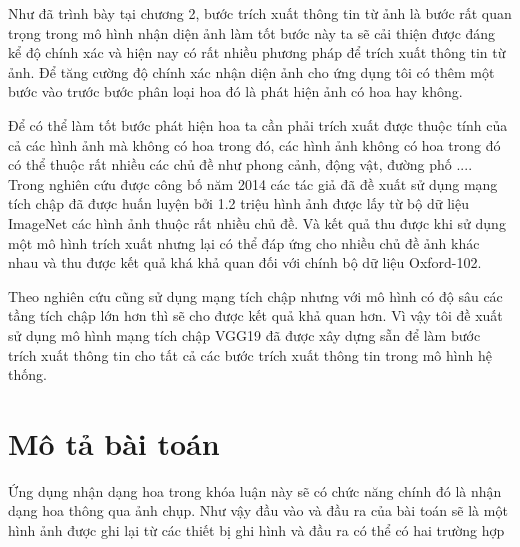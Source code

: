 \documentclass[12pt]{report}
\begin{document}
		Như đã trình bày tại chương 2, bước trích xuất thông tin từ ảnh là bước rất quan trọng trong mô hình nhận diện ảnh làm tốt bước này ta sẽ cải thiện được đáng kể độ chính xác và hiện nay có rất nhiều phương pháp để trích xuất thông tin từ ảnh. Để tăng cường độ chính xác nhận diện ảnh cho ứng dụng tôi có thêm một bước vào trước bước phân loại hoa đó là phát hiện ảnh có hoa hay không. 
																
		Để có thể làm tốt bước phát hiện hoa ta cần phải trích xuất được thuộc tính của cả các hình ảnh mà không có hoa trong đó, các hình ảnh không có hoa trong đó có thể thuộc rất nhiều các chủ đề như phong cảnh, động vật, đường phố .... Trong nghiên cứu \cite{cia-CNNFeatures off-the-shelf} được công bố năm 2014 các tác giả đã đề xuất sử dụng mạng tích chập đã được huấn luyện bởi 1.2 triệu hình ảnh được lấy từ bộ dữ liệu ImageNet các hình ảnh thuộc rất nhiều chủ đề. Và kết quả thu được khi sử dụng một mô hình trích xuất nhưng lại có thể đáp ứng cho nhiều chủ đề ảnh khác nhau và thu được kết quả khá khả quan đối với chính bộ dữ liệu Oxford-102. 
																
		Theo nghiên cứu \cite{cia_vgg19} cũng sử dụng mạng tích chập nhưng với mô hình có độ sâu các tầng tích chập lớn hơn thì sẽ cho được kết quả khả quan hơn. Vì vậy tôi đề xuất sử dụng mô hình mạng tích chập VGG19 \cite{cia_vgg19} đã được xây dựng sẵn để làm bước trích xuất thông tin cho tất cả các bước trích xuất thông tin trong mô hình hệ thống.
																
		\section{Mô tả bài toán}
		Ứng dụng nhận dạng hoa trong khóa luận này sẽ có chức năng chính đó là nhận dạng hoa thông qua ảnh chụp. Như vậy đầu vào và đầu ra của bài toán sẽ là một hình ảnh được ghi lại từ các thiết bị ghi hình và đầu ra có thể có hai trường hợp																																																																			
																					
\end{document}

